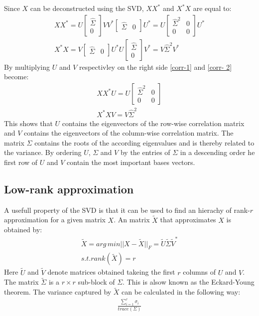 Since \(X\) can be deconstructed using the SVD, \(XX^{*}\) and \(X^{*}X\) are equal to:
\begin{gather}
XX^{*} = U\begin{bmatrix}
\hat{\Sigma} \\
0
\end{bmatrix}VV^{*}\begin{bmatrix}
\hat{\Sigma} & 0
\end{bmatrix}U^{*} = U \begin{bmatrix}
\hat{\Sigma}^{2} & 0 \\
0 & 0
\end{bmatrix} U^{*} \label{corr-1}\\
X^{*}X = V \begin{bmatrix}
\hat{\Sigma} & 0
\end{bmatrix} U^{*}U \begin{bmatrix}
\hat{\Sigma} \\
0
\end{bmatrix} V^{*} = V\hat{\Sigma}^{2}V^{*} \label{corr- 2}
\end{gather}
By multiplying \(U\) and \(V\) respectivley on the right side \ref{corr-1} and \ref{corr- 2} become:
\begin{gather}
XX^{*}U = U \begin{bmatrix}
\hat{\Sigma}^{2} & 0 \\
0 & 0
\end{bmatrix} \\
X^{*}XV = V\hat{\Sigma}^{2}
\end{gather}
This shows that \(U\) contains the eigenvectors of the row-wise correlation matrix and \(V\) contains the eigenvectors of the column-wise correlation matrix.
The matrix \(\Sigma\) contains the roots of the according eigenvalues and is thereby related to the variance.
By ordering \(U\), \(\Sigma\) and \(V\) by the entries of \(\Sigma\) in a descending order he first row of \(U\) and \(V\) contain the most important bases vectors. \cite{brunton_kutz_2019}

\subsection{Low-rank approximation}
A usefull property of the SVD is that it can be used to find an hierachy of rank-\(r\) approximation for a given matrix \(X\).
An matrix \(\tilde{X}\) that approximates \(X\) is obtained by:
\begin{gather}
\tilde{X} = arg\,min ||X - \tilde{X}||_F = \tilde{U}\tilde{\Sigma}\tilde{V}^{*}	\\
s.t. rank(\tilde{X}) = r
\end{gather}	
Here  \(\tilde{U}\) and \(\tilde{V}\) denote matrices obtained takeing the first \(r\) columns of \(U\) and \(V\). The matrix \(\tilde{\Sigma}\) is a \(r \times r\) sub-block of \(\Sigma\).
This is alsow known as the Eckard-Young theorem.
The variance captured by \(\tilde{X}\) can be calculated in the following way:
\begin{gather}
\frac{\sum_{i = 1}^{r} \sigma_i}{trace(\Sigma)}
\end{gather}
\cite{brunton_kutz_2019}

